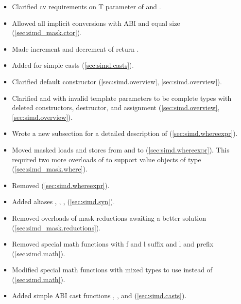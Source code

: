 \begin{itemize}
    \item Clarified cv requirements on \type T parameter of \simd and \mask.
    \item Allowed all implicit \mask conversions with \fixedsize ABI and equal size (\ref{sec:simd_mask.ctor}).
    \item Made increment and decrement of  return .
    \item Added  for simple casts (\ref{sec:simd.casts}).
    \item Clarified default constructor (\ref{sec:simd.overview}, \ref{sec:simd.overview}).
    \item Clarified \simd and \mask with invalid template parameters to be complete types with deleted constructors, destructor, and assignment (\ref{sec:simd.overview}, \ref{sec:simd.overview}).
    \item Wrote a new subsection for a detailed description of  (\ref{sec:simd.whereexpr}).
    \item Moved masked loads and stores from \simd and \mask to  (\ref{sec:simd.whereexpr}).
          This required two more overloads of  to support value objects of type \mask (\ref{sec:simd_mask.where}).
    \item Removed  (\ref{sec:simd.whereexpr}).
    \item Added aliases , , ,  (\ref{sec:simd.syn}).
    \item Removed \bool overloads of mask reductions awaiting a better solution (\ref{sec:simd_mask.reductions}).
    \item Removed special math functions with \code f and \code l suffix and \code l and  prefix (\ref{sec:simd.math}).
    \item Modified special math functions with mixed types to use  instead of  (\ref{sec:simd.math}).
    \item Added simple ABI cast functions , , and  (\ref{sec:simd.casts}).
\end{itemize}

